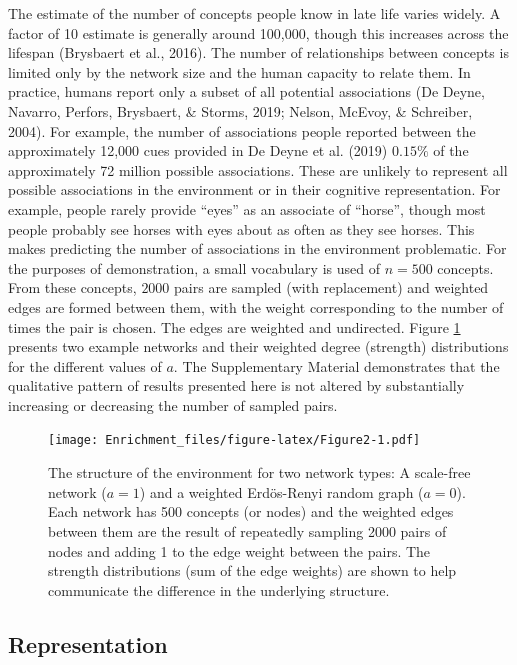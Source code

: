 \documentclass[
  man,floatsintext]{apa6}
\begin{document}
The estimate of the number of concepts people know in late life varies widely. A factor of 10 estimate is generally around 100,000, though this increases across the lifespan (Brysbaert et al., 2016). The number of relationships between concepts is limited only by the network size and the human capacity to relate them. In practice, humans report only a subset of all potential associations (De Deyne, Navarro, Perfors, Brysbaert, \& Storms, 2019; Nelson, McEvoy, \& Schreiber, 2004). For example, the number of associations people reported between the approximately 12,000 cues provided in De Deyne et al. (2019) \(0.15 \%\) of the approximately 72 million possible associations. These are unlikely to represent all possible associations in the environment or in their cognitive representation. For example, people rarely provide ``eyes'' as an associate of ``horse'', though most people probably see horses with eyes about as often as they see horses. This makes predicting the number of associations in the environment problematic. For the purposes of demonstration, a small vocabulary is used of \(n=500\) concepts. From these concepts, \(2000\) pairs are sampled (with replacement) and weighted edges are formed between them, with the weight corresponding to the number of times the pair is chosen. The edges are weighted and undirected. Figure \ref{fig:Figure2} presents two example networks and their weighted degree (strength) distributions for the different values of \(a\). The Supplementary Material demonstrates that the qualitative pattern of results presented here is not altered by substantially increasing or decreasing the number of sampled pairs.

\begin{figure}
\centering
\texttt{[image: Enrichment\_files/figure-latex/Figure2-1.pdf]}
\caption{\label{fig:Figure2}The structure of the environment for two network types: A scale-free network (\(a=1\)) and a weighted Erdös-Renyi random graph (\(a=0\)). Each network has 500 concepts (or nodes) and the weighted edges between them are the result of repeatedly sampling 2000 pairs of nodes and adding 1 to the edge weight between the pairs. The strength distributions (sum of the edge weights) are shown to help communicate the difference in the underlying structure.}
\end{figure}

\hypertarget{representation}{%
\subsection{Representation}\label{representation}}
\end{document}
